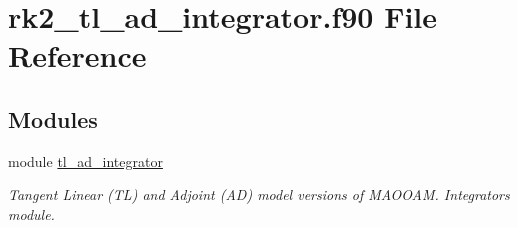 \hypertarget{rk2__tl__ad__integrator_8f90}{}\section{rk2\+\_\+tl\+\_\+ad\+\_\+integrator.\+f90 File Reference}
\label{rk2__tl__ad__integrator_8f90}
\subsection*{Modules}
\begin{DoxyCompactItemize}
\item 
module \hyperlink{namespacetl__ad__integrator}{tl\+\_\+ad\+\_\+integrator}
\begin{DoxyCompactList}\small\item\em Tangent Linear (TL) and Adjoint (AD) model versions of M\+A\+O\+O\+AM. Integrators module. \end{DoxyCompactList}\end{DoxyCompactItemize}

